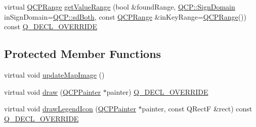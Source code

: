 \begin{DoxyCompactItemize}
\item 
virtual \mbox{\hyperlink{class_q_c_p_range}{Q\+C\+P\+Range}} \mbox{\hyperlink{class_q_c_p_color_map_a88134493aaf6b297af34eaab65264fff}{get\+Value\+Range}} (bool \&found\+Range, \mbox{\hyperlink{namespace_q_c_p_afd50e7cf431af385614987d8553ff8a9}{Q\+C\+P\+::\+Sign\+Domain}} in\+Sign\+Domain=\mbox{\hyperlink{namespace_q_c_p_afd50e7cf431af385614987d8553ff8a9aa38352ef02d51ddfa4399d9551566e24}{Q\+C\+P\+::sd\+Both}}, const \mbox{\hyperlink{class_q_c_p_range}{Q\+C\+P\+Range}} \&in\+Key\+Range=\mbox{\hyperlink{class_q_c_p_range}{Q\+C\+P\+Range}}()) const \mbox{\hyperlink{qcustomplot_8h_a42cc5eaeb25b85f8b52d2a4b94c56f55}{Q\+\_\+\+D\+E\+C\+L\+\_\+\+O\+V\+E\+R\+R\+I\+DE}}
\end{DoxyCompactItemize}
\subsection*{Protected Member Functions}
\begin{DoxyCompactItemize}
\item 
virtual void \mbox{\hyperlink{class_q_c_p_color_map_a5efcea591bb5486d968af520a4d43c3a}{update\+Map\+Image}} ()
\item 
virtual void \mbox{\hyperlink{class_q_c_p_color_map_a6b628014d2939368935efd0a788648c8}{draw}} (\mbox{\hyperlink{class_q_c_p_painter}{Q\+C\+P\+Painter}} $\ast$painter) \mbox{\hyperlink{qcustomplot_8h_a42cc5eaeb25b85f8b52d2a4b94c56f55}{Q\+\_\+\+D\+E\+C\+L\+\_\+\+O\+V\+E\+R\+R\+I\+DE}}
\item 
virtual void \mbox{\hyperlink{class_q_c_p_color_map_adeaa5e262a03b7f021bd1aa6f1e60ce9}{draw\+Legend\+Icon}} (\mbox{\hyperlink{class_q_c_p_painter}{Q\+C\+P\+Painter}} $\ast$painter, const Q\+RectF \&rect) const \mbox{\hyperlink{qcustomplot_8h_a42cc5eaeb25b85f8b52d2a4b94c56f55}{Q\+\_\+\+D\+E\+C\+L\+\_\+\+O\+V\+E\+R\+R\+I\+DE}}
\end{DoxyCompactItemize}
